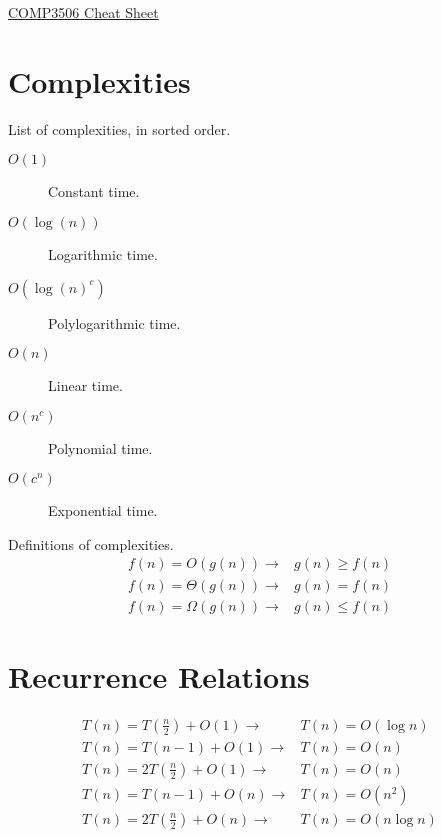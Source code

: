 \documentclass[landscape]{cheat}
\begin{document}
\footnotesize
\begin{multicols}{3}

\begin{center}
\Large{\underline{COMP3506 Cheat Sheet}} \\
\end{center}


\section{Complexities}
List of complexities, in sorted order.
\begin{description}
    \item[$O(1)$] Constant time.
    \item[$O(\log(n))$] Logarithmic time.
    \item[$O(\log(n)^c)$] Polylogarithmic time.
    \item[$O(n)$] Linear time.
    \item[$O(n^c)$] Polynomial time.
    \item[$O(c^n)$] Exponential time.
\end{description}
Definitions of complexities.
\begin{align*}
    f(n) = O(g(n)) \rightarrow& g(n) \geq f(n) \\
    f(n) = \Theta(g(n)) \rightarrow& g(n) = f(n) \\
    f(n) = \Omega(g(n)) \rightarrow& g(n) \leq f(n)
\end{align*}

\section{Recurrence Relations}
\begin{align*}
    T(n) = T(\frac n 2) + O(1) \rightarrow& T(n) = O(\log n) \\
    T(n) = T(n - 1) + O(1) \rightarrow& T(n) = O(n) \\
    T(n) = 2 T(\frac n 2) + O(1) \rightarrow& T(n) = O(n) \\
    T(n) = T(n - 1) + O(n) \rightarrow& T(n) = O(n^2) \\
    T(n) = 2 T(\frac n 2) + O(n) \rightarrow& T(n) = O(n \log n)
\end{align*}


\end{multicols}
\end{document}
